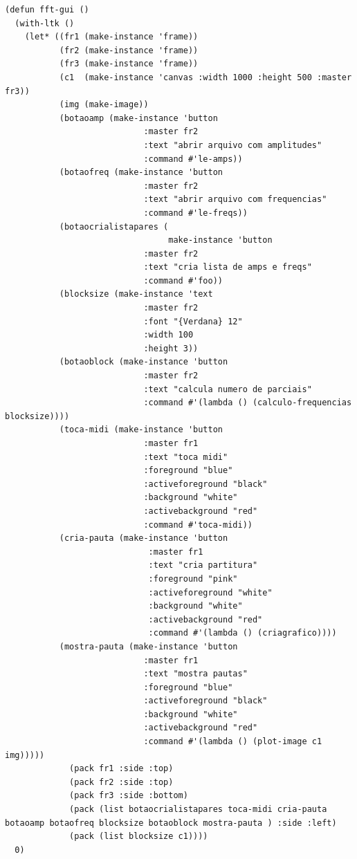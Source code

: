 \documentclass{ppgmus}
\begin{document}
\begin{verbatim}
(defun fft-gui ()
  (with-ltk ()
    (let* ((fr1 (make-instance 'frame))
           (fr2 (make-instance 'frame))
           (fr3 (make-instance 'frame))
           (c1  (make-instance 'canvas :width 1000 :height 500 :master fr3))
           (img (make-image))
           (botaoamp (make-instance 'button
                            :master fr2
                            :text "abrir arquivo com amplitudes"
                            :command #'le-amps))
           (botaofreq (make-instance 'button
                            :master fr2          
                            :text "abrir arquivo com frequencias"
                            :command #'le-freqs))
           (botaocrialistapares (
                                 make-instance 'button
                            :master fr2            
                            :text "cria lista de amps e freqs"
                            :command #'foo))
           (blocksize (make-instance 'text
                            :master fr2      
                            :font "{Verdana} 12"
                            :width 100
                            :height 3))
           (botaoblock (make-instance 'button
                            :master fr2
                            :text "calcula numero de parciais"
                            :command #'(lambda () (calculo-frequencias blocksize)))) 
           (toca-midi (make-instance 'button
                            :master fr1
                            :text "toca midi"
                            :foreground "blue"
                            :activeforeground "black"
                            :background "white"
                            :activebackground "red"
                            :command #'toca-midi))
           (cria-pauta (make-instance 'button
                             :master fr1
                             :text "cria partitura"
                             :foreground "pink"
                             :activeforeground "white"
                             :background "white"
                             :activebackground "red"
                             :command #'(lambda () (criagrafico))))
           (mostra-pauta (make-instance 'button
                            :master fr1
                            :text "mostra pautas"
                            :foreground "blue"
                            :activeforeground "black"
                            :background "white"
                            :activebackground "red"
                            :command #'(lambda () (plot-image c1 img)))))
             (pack fr1 :side :top)
             (pack fr2 :side :top)
             (pack fr3 :side :bottom)
             (pack (list botaocrialistapares toca-midi cria-pauta botaoamp botaofreq blocksize botaoblock mostra-pauta ) :side :left)
             (pack (list blocksize c1))))
  0)

\end{verbatim}
\end{document}
